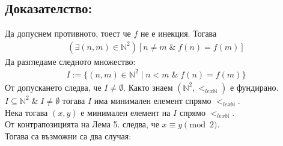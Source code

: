 \documentclass[a4paper, 12pt, oneside]{article}
\begin{document}
\subsection*{Доказателство:}
Да допуснем противното, тоест че \(f\) не е инекция.
Тогава
\begin{align*}
    (\exists (n, m) \in \mathbb{N}^2)[n \neq m \; \& \; f(n) = f(m)]
\end{align*}
Да разгледаме следното множество:
\begin{align*}
    I := \{(n, m) \in \mathbb{N}^2 \; | \; n < m \; \& \; f(n) = f(m)\}
\end{align*}
От допускането следва, че \(I \neq \emptyset\). Както знаем \((\mathbb{N}^2, <_{lex \mathbb{N}})\) е фундирано. \\
\(I \subseteq \mathbb{N}^2 \; \& \; I \neq \emptyset\) тогава \(I\) има минимален елемент спрямо \(<_{lex \mathbb{N}}\). \\
Нека тогава \((x, y)\) е минимален елемент на \(I\) спрямо \(<_{lex \mathbb{N}}\). \\
От контрапозицията на Лема 5. следва, че \(x \equiv y \pmod{2}\). \\
Тогава са възможни са два случая:
\end{document}
